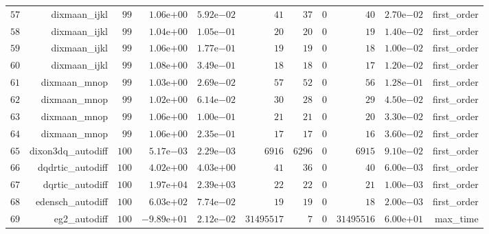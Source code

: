 \documentclass[varwidth=20cm,crop=true]{standalone}
\begin{document}
\begin{longtable}{rrrrrrrrrrr}
  \(    57\) & dixmaan\_ijkl & \(    99\) & \( 1.06\)e\(+00\) & \( 5.92\)e\(-02\) & \(    41\) & \(    37\) & \(     0\) & \(    40\) & \( 2.70\)e\(-02\) & first\_order \\
  \(    58\) & dixmaan\_ijkl & \(    99\) & \( 1.04\)e\(+00\) & \( 1.05\)e\(-01\) & \(    20\) & \(    20\) & \(     0\) & \(    19\) & \( 1.40\)e\(-02\) & first\_order \\
  \(    59\) & dixmaan\_ijkl & \(    99\) & \( 1.06\)e\(+00\) & \( 1.77\)e\(-01\) & \(    19\) & \(    19\) & \(     0\) & \(    18\) & \( 1.00\)e\(-02\) & first\_order \\
  \(    60\) & dixmaan\_ijkl & \(    99\) & \( 1.08\)e\(+00\) & \( 3.49\)e\(-01\) & \(    18\) & \(    18\) & \(     0\) & \(    17\) & \( 1.20\)e\(-02\) & first\_order \\
  \(    61\) & dixmaan\_mnop & \(    99\) & \( 1.03\)e\(+00\) & \( 2.69\)e\(-02\) & \(    57\) & \(    52\) & \(     0\) & \(    56\) & \( 1.28\)e\(-01\) & first\_order \\
  \(    62\) & dixmaan\_mnop & \(    99\) & \( 1.02\)e\(+00\) & \( 6.14\)e\(-02\) & \(    30\) & \(    28\) & \(     0\) & \(    29\) & \( 4.50\)e\(-02\) & first\_order \\
  \(    63\) & dixmaan\_mnop & \(    99\) & \( 1.06\)e\(+00\) & \( 1.00\)e\(-01\) & \(    21\) & \(    21\) & \(     0\) & \(    20\) & \( 3.30\)e\(-02\) & first\_order \\
  \(    64\) & dixmaan\_mnop & \(    99\) & \( 1.06\)e\(+00\) & \( 2.35\)e\(-01\) & \(    17\) & \(    17\) & \(     0\) & \(    16\) & \( 3.60\)e\(-02\) & first\_order \\
  \(    65\) & dixon3dq\_autodiff & \(   100\) & \( 5.17\)e\(-03\) & \( 2.29\)e\(-03\) & \(  6916\) & \(  6296\) & \(     0\) & \(  6915\) & \( 9.10\)e\(-02\) & first\_order \\
  \(    66\) & dqdrtic\_autodiff & \(   100\) & \( 4.02\)e\(+00\) & \( 4.03\)e\(+00\) & \(    41\) & \(    36\) & \(     0\) & \(    40\) & \( 6.00\)e\(-03\) & first\_order \\
  \(    67\) & dqrtic\_autodiff & \(   100\) & \( 1.97\)e\(+04\) & \( 2.39\)e\(+03\) & \(    22\) & \(    22\) & \(     0\) & \(    21\) & \( 1.00\)e\(-03\) & first\_order \\
  \(    68\) & edensch\_autodiff & \(   100\) & \( 6.03\)e\(+02\) & \( 7.74\)e\(-02\) & \(    19\) & \(    19\) & \(     0\) & \(    18\) & \( 2.00\)e\(-03\) & first\_order \\
  \(    69\) & eg2\_autodiff & \(   100\) & \(-9.89\)e\(+01\) & \( 2.12\)e\(-02\) & \(31495517\) & \(     7\) & \(     0\) & \(31495516\) & \( 6.00\)e\(+01\) & max\_time \\

\end{longtable}
\end{document}
